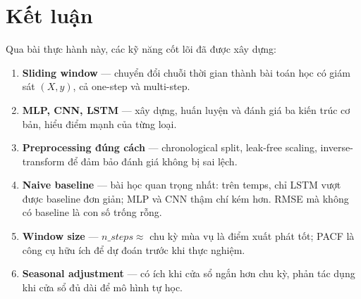 \documentclass[12pt,a4paper]{article}
\begin{document}
\section*{Kết luận}

Qua bài thực hành này, các kỹ năng cốt lõi đã được xây dựng:

\begin{enumerate}
    \item \textbf{Sliding window} --- chuyển đổi chuỗi thời gian thành bài toán học có giám sát $(X, y)$, cả one-step và multi-step.
    \item \textbf{MLP, CNN, LSTM} --- xây dựng, huấn luyện và đánh giá ba kiến trúc cơ bản, hiểu điểm mạnh của từng loại.
    \item \textbf{Preprocessing đúng cách} --- chronological split, leak-free scaling, inverse-transform để đảm bảo đánh giá không bị sai lệch.
    \item \textbf{Naive baseline} --- bài học quan trọng nhất: trên temps, chỉ LSTM vượt được baseline đơn giản; MLP và CNN thậm chí kém hơn. RMSE mà không có baseline là con số trống rỗng.
    \item \textbf{Window size} --- $n\_steps \approx$ chu kỳ mùa vụ là điểm xuất phát tốt; PACF là công cụ hữu ích để dự đoán trước khi thực nghiệm.
    \item \textbf{Seasonal adjustment} --- có ích khi cửa sổ ngắn hơn chu kỳ, phản tác dụng khi cửa sổ đủ dài để mô hình tự học.
\end{enumerate}
\end{document}
